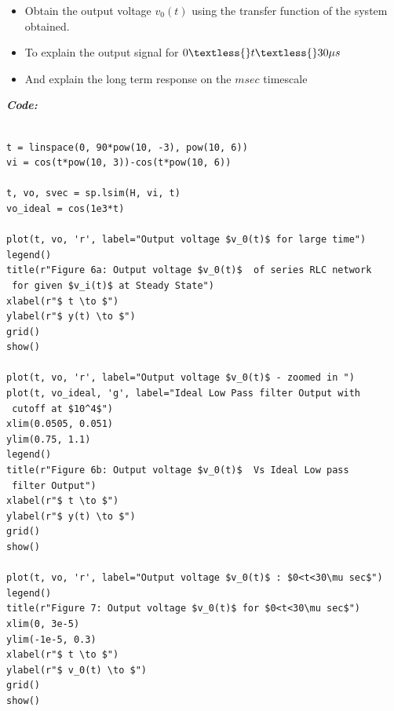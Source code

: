 \documentclass[11pt, a4paper]{article}
\begin{document}
\begin{itemize}
\item
  Obtain the output voltage \(v_0(t)\) using the transfer function of
  the system obtained.
\item
  To explain the output signal for $ 0 \textless{} t \textless{} 30
  \mu s $
\item
  And explain the long term response on the \(msec\) timescale
\end{itemize}
\textit{\textbf{Code:}}
\begin{lstlisting}
  
t = linspace(0, 90*pow(10, -3), pow(10, 6))
vi = cos(t*pow(10, 3))-cos(t*pow(10, 6))

t, vo, svec = sp.lsim(H, vi, t)
vo_ideal = cos(1e3*t)

plot(t, vo, 'r', label="Output voltage $v_0(t)$ for large time")
legend()
title(r"Figure 6a: Output voltage $v_0(t)$  of series RLC network
 for given $v_i(t)$ at Steady State")
xlabel(r"$ t \to $")
ylabel(r"$ y(t) \to $")
grid()
show()

plot(t, vo, 'r', label="Output voltage $v_0(t)$ - zoomed in ")
plot(t, vo_ideal, 'g', label="Ideal Low Pass filter Output with
 cutoff at $10^4$")
xlim(0.0505, 0.051)
ylim(0.75, 1.1)
legend()
title(r"Figure 6b: Output voltage $v_0(t)$  Vs Ideal Low pass
 filter Output")
xlabel(r"$ t \to $")
ylabel(r"$ y(t) \to $")
grid()
show()

plot(t, vo, 'r', label="Output voltage $v_0(t)$ : $0<t<30\mu sec$")
legend()
title(r"Figure 7: Output voltage $v_0(t)$ for $0<t<30\mu sec$")
xlim(0, 3e-5)
ylim(-1e-5, 0.3)
xlabel(r"$ t \to $")
ylabel(r"$ v_0(t) \to $")
grid()
show()
\end{lstlisting}
\newpage
\end{document}
